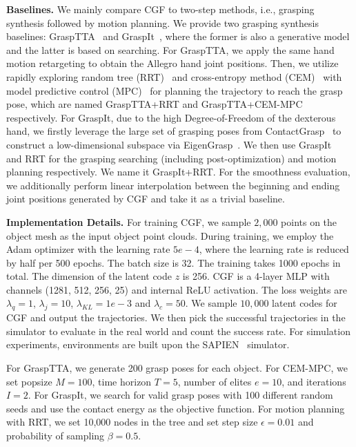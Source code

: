 \documentclass[letterpaper, 10 pt, journal, twoside]{IEEEtran}
\begin{document}
\textbf{Baselines.} We mainly compare CGF to two-step methods, i.e., grasping synthesis followed by motion planning. We provide two grasping synthesis baselines: GraspTTA~\cite{jiang2021hand} and GraspIt~\cite{miller2004graspit}, where the former is also a generative model and the latter is based on searching.
For GraspTTA, we apply the same hand motion retargeting to obtain the Allegro hand joint positions.
Then, we utilize rapidly exploring random tree (RRT)~\cite{lavalle1998rapidly} and cross-entropy method (CEM)~\cite{rubinstein1999cross} with model predictive control (MPC)~\cite{maciejowski2002predictive} for planning the trajectory to reach the grasp pose, which are named GraspTTA+RRT and GraspTTA+CEM-MPC respectively.
For GraspIt, due to the high Degree-of-Freedom of the dexterous hand, we firstly leverage the large set of grasping poses from ContactGrasp~\cite{brahmbhatt2019contactgrasp} to construct a low-dimensional subspace via EigenGrasp~\cite{ciocarlie2007dexterous}. We then use GraspIt~\cite{miller2004graspit} and RRT for the grasping searching (including post-optimization) and motion planning respectively. We name it GraspIt+RRT. For the smoothness evaluation, we additionally perform linear interpolation between the beginning and ending joint positions generated by CGF and take it as a trivial baseline.

\textbf{Implementation Details.}
For training CGF, we sample $2,000$ points on the object mesh as the input object point clouds. During training, we employ the Adam optimizer with the learning rate $5e-4$, where the learning rate is reduced by half per 500 epochs. The batch size is 32. The training takes 1000 epochs in total. The dimension of the latent code $z$ is 256. CGF is a 4-layer MLP with channels (1281, 512, 256, 25) and internal ReLU activation. The loss weights are $\lambda_q = 1$, $\lambda_j = 10$, $\lambda_{KL} = 1e-3$ and $\lambda_c = 50$. We sample $10,000$ latent codes for CGF and output the trajectories. We then pick the successful trajectories in the simulator to evaluate in the real world and count the success rate. For simulation experiments, environments are built upon the SAPIEN~\cite{xiang2020sapien} simulator.

For GraspTTA, we generate 200 grasp poses for each object. For CEM-MPC, we set popsize $M=100$, time horizon $T=5$, number of elites $e=10$, and iterations $I=2$. For GraspIt, we search for valid grasp poses with 100 different random seeds and use the contact energy as the objective function. For motion planning with RRT, we set 10,000 nodes in the tree and set step size $\epsilon=0.01$ and probability of sampling $\beta=0.5$.
\end{document}
